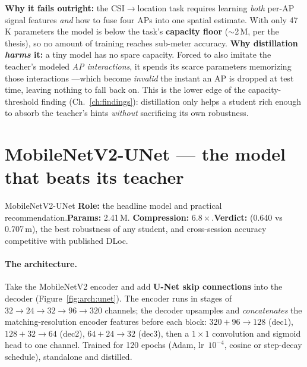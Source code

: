 \begin{whybox}
\textbf{Why it fails outright:} the CSI$\to$location task requires learning \emph{both} per-AP signal
features \emph{and} how to fuse four APs into one spatial estimate. With only 47\,K parameters the
model is below the task's \textbf{capacity floor} ($\sim$2\,M, per the thesis), so no amount of
training reaches sub-meter accuracy. \textbf{Why distillation \emph{harms} it:} a tiny model has no
spare capacity. Forced to also imitate the teacher's modeled \emph{AP interactions}, it spends its
scarce parameters memorizing those interactions ---which become \emph{invalid} the instant an AP is
dropped at test time, leaving nothing to fall back on. This is the lower edge of the capacity-threshold
finding (Ch.~\ref{ch:findings}): distillation only helps a student rich enough to absorb the teacher's
hints \emph{without} sacrificing its own robustness.
\end{whybox}

\section{MobileNetV2-UNet --- the model that beats its teacher}
\label{sec:arch:unet}

\begin{ataglance}{MobileNetV2-UNet}
\textbf{Role:} the headline model and practical recommendation.\quad \textbf{Params:} 2.41\,M.\quad
\textbf{Compression:} $6.8\times$.\quad \textbf{Verdict:}  (0.640 vs 0.707\,m), the best robustness of any student, and cross-session accuracy
competitive with published DLoc.
\end{ataglance}

\paragraph{The architecture.} Take the MobileNetV2 encoder and add \textbf{U-Net skip connections}
into the decoder (Figure~\ref{fig:arch:unet}). The encoder runs in stages of $32\to24\to32\to96\to320$
channels; the decoder upsamples and \emph{concatenates} the matching-resolution encoder features
before each block: $320{+}96\to128$ (dec1), $128{+}32\to64$ (dec2), $64{+}24\to32$ (dec3), then a
$1\times1$ convolution and sigmoid head to one channel. Trained for 120 epochs (Adam, lr~$10^{-4}$,
cosine or step-decay schedule), standalone and distilled.

